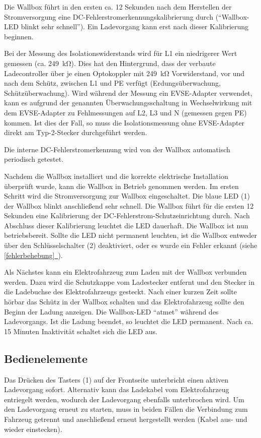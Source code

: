 \documentclass[a4paper,10pt]{article}
\newcommand*{\fullref}[1]{\hyperref[{#1}]{\ref*{#1}~\nameref*{#1}}}
\begin{document}
\begin{multicols*}{2}
	Die Wallbox führt in den ersten ca. 12 Sekunden nach dem Herstellen der Stromversorgung
	eine DC-Fehlerstromerkennungskalibrierung durch (\enquote{Wallbox-LED blinkt sehr schnell}).
	Ein Ladevorgang kann erst nach dieser Kalibrierung beginnen.

	Bei der Messung des Isolationswiderstands wird für L1 ein niedrigerer Wert
	gemessen (ca. \SI{249}{\kilo\ohm}). Dies hat den Hintergrund, dass
	der verbaute Ladecontroller über je einen Optokoppler mit
	\SI{249}{\kilo\ohm} Vorwiderstand, vor und nach dem Schütz, zwischen L1 und
	PE verfügt (Erdungsüberwachung, Schützüberwachung). Wird während der Messung ein EVSE-Adapter verwendet,
	kann es aufgrund der genannten Überwachungsschaltung in Wechselwirkung mit dem EVSE-Adapter zu Fehlmessungen
	auf L2, L3 und N (gemessen gegen PE) kommen. Ist dies der Fall, so muss die Isolationsmessung
	ohne EVSE-Adapter direkt am Typ-2-Stecker durchgeführt werden.

	Die interne DC-Fehlerstromerkennung wird von der Wallbox automatisch
	periodisch getestet.
	
	Nachdem die Wallbox installiert
	und die korrekte elektrische Installation überprüft wurde, kann die Wallbox in
	Betrieb genommen werden.
	Im ersten Schritt wird die Stromversorgung zur Wallbox eingeschaltet. Die
	blaue LED (1) der Wallbox blinkt anschließend sehr schnell. Die Wallbox führt
	für die ersten 12 Sekunden eine Kalibrierung der
	DC-Fehlerstrom-Schutzeinrichtung durch. Nach Abschluss dieser Kalibrierung
	leuchtet die LED dauerhaft. Die Wallbox ist nun betriebsbereit. Sollte die LED
	nicht permanent leuchten, ist die Wallbox entweder über den Schlüsselschalter (2) deaktiviert,
	oder es wurde ein Fehler erkannt (siehe \fullref{fehlerbehebung}).

	Als Nächstes kann ein Elektrofahrzeug zum Laden mit der Wallbox verbunden
	werden. Dazu wird die Schutzkappe vom Ladestecker entfernt und den Stecker in die
	Ladebuchse des Elektrofahrzeugs gesteckt. Nach einer kurzen Zeit sollte hörbar
	das Schütz in der Wallbox schalten und das Elektrofahrzeug sollte den Beginn
	der Ladung anzeigen. Die Wallbox-LED \enquote{atmet} während des
	Ladevorgangs. Ist die Ladung beendet, so leuchtet die LED permanent. Nach ca.
	15 Minuten Inaktivität schaltet sich die LED aus.

	\subsection{Bedienelemente}\label{lockswitch}
	Das Drücken des Tasters (1) auf der Frontseite unterbricht einen aktiven Ladevorgang
	sofort. Alternativ kann das Ladekabel vom Elektrofahrzeug entriegelt werden,
	wodurch der Ladevorgang ebenfalls unterbrochen wird. Um den Ladevorgang erneut
	zu starten, muss in beiden Fällen die Verbindung zum Fahrzeug getrennt und
	anschließend erneut hergestellt werden (Kabel aus- und wieder einstecken).


\end{multicols*}
\end{document}
